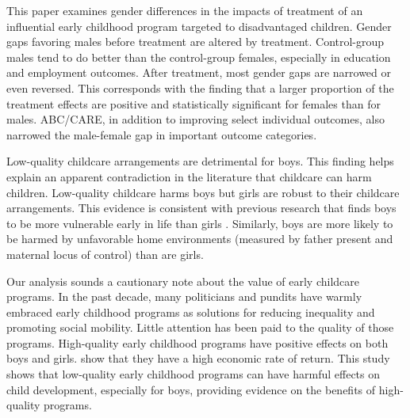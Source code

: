 This paper examines gender differences in the impacts of treatment of an influential early childhood program targeted to disadvantaged children. Gender gaps favoring males before treatment are altered by treatment. Control-group males tend to do better than the control-group females, especially in education and employment outcomes. After treatment, most gender gaps are narrowed or even reversed. This corresponds with the finding that a larger proportion of the treatment effects are positive and statistically significant for females than for males. ABC/CARE, in addition to improving select individual outcomes, also narrowed the male-female gap in important outcome categories.

Low-quality childcare arrangements are detrimental for boys. This finding helps explain an apparent contradiction in the literature \citep{Baker_Gruber_etal_2008_JPE,Baker_Gruber_Milligan_2015_Noncog_Defects,Kottelenberg_Lehrer_2014_Gender-Effects} that childcare can harm children. Low-quality childcare harms boys but girls are robust to their childcare arrangements. This evidence is consistent with previous research that finds boys to be more vulnerable early in life than girls \citep{Golding_Fitzgerald_2017_IMHJ}. Similarly, boys are more likely to be harmed by unfavorable home environments (measured by father present and maternal locus of control) than are girls.

Our analysis sounds a cautionary note about the value of early childcare programs. In the past decade, many politicians and pundits have warmly embraced early childhood programs as solutions for reducing inequality and promoting social mobility. Little attention has been paid to the quality of those programs. High-quality early childhood programs have positive effects on both boys and girls. \cite{Garcia_Heckman_Leaf_etal_2017_Comp_CBA_Unpublished} show that they have a high economic rate of return. This study shows that low-quality early childhood programs can have harmful effects on child development, especially for boys, providing evidence on the benefits of high-quality programs.

